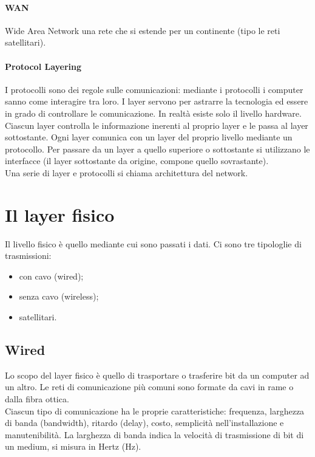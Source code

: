 \documentclass{article}
\begin{document}
\paragraph{WAN} Wide Area Network una rete che si estende per un continente (tipo
le reti satellitari).

\paragraph{Protocol Layering} I protocolli sono dei regole sulle comunicazioni:
mediante i protocolli i computer sanno come interagire tra loro.
I layer servono per astrarre la tecnologia ed essere in grado di controllare le
comunicazione. In realtà esiste solo il livello hardware.
Ciascun layer controlla le informazione inerenti al proprio layer e le
passa al layer sottostante. Ogni layer comunica con un layer del proprio
livello mediante un protocollo. Per passare da un layer a quello superiore o
sottostante si utilizzano le interfacce (il layer sottostante da origine,
compone quello sovrastante).\\
Una serie di layer e protocolli si chiama architettura del network.

\section{Il layer fisico}
Il livello fisico è quello mediante cui sono passati i dati. Ci sono tre
tipologlie di trasmissioni:
\begin{itemize}
	\item con cavo (wired);
	\item senza cavo (wireless);
	\item satellitari.
\end{itemize}

\subsection{Wired}
Lo scopo del layer fisico è quello di trasportare o trasferire bit da un
computer ad un altro. Le reti di comunicazione più comuni sono formate da cavi
in rame o dalla fibra ottica.\\
Ciascun tipo di comunicazione ha le proprie caratteristiche: frequenza,
larghezza di banda (bandwidth), ritardo (delay), costo, semplicità
nell'installazione e manutenibilità. La larghezza di banda indica la velocità
di trasmissione di bit di un medium, si misura in Hertz (Hz).
\end{document}
